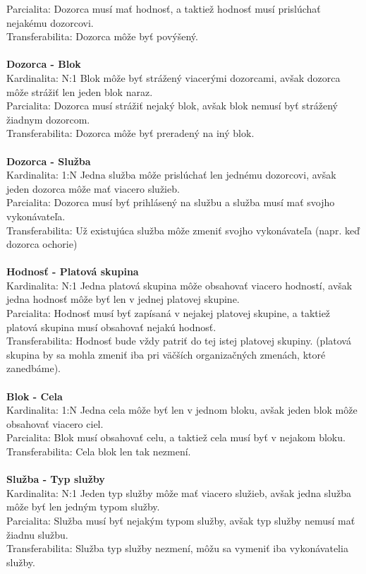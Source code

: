 \documentclass[slovak, 12pt, Times New Roman]{article}
\begin{document}
				Parcialita: Dozorca musí mať hodnosť, a taktiež hodnosť musí prislúchať nejakému dozorcovi.\\ 
				Transferabilita: Dozorca môže byť povýšený.\\ \\
			\textbf{Dozorca - Blok} \\
				Kardinalita: N:1 Blok môže byť strážený viacerými dozorcami, avšak dozorca môže strážiť len jeden blok naraz.\\
				Parcialita: Dozorca musí strážiť nejaký blok, avšak blok nemusí byť strážený žiadnym dozorcom.\\ 
				Transferabilita: Dozorca môže byť preradený na iný blok.\\ \\ \clearpage
			\textbf{Dozorca - Služba} \\
				Kardinalita: 1:N Jedna služba môže prislúchať len jednému dozorcovi, avšak jeden dozorca môže mať viacero služieb.\\
				Parcialita: Dozorca musí byť prihlásený na službu a služba musí mať svojho vykonávateľa.\\ 
				Transferabilita: Už existujúca služba môže zmeniť svojho vykonávateľa (napr. keď dozorca ochorie)\\ \\ 
			\textbf{Hodnosť - Platová skupina} \\
				Kardinalita: N:1 Jedna platová skupina môže obsahovať viacero hodností, avšak jedna hodnosť môže byť len v jednej platovej 
				skupine.\\
				Parcialita: Hodnosť musí byť zapísaná v nejakej platovej skupine, a taktiež platová skupina musí obsahovať nejakú hodnosť.\\ 
				Transferabilita: Hodnosť bude vždy patriť do tej istej platovej skupiny. (platová skupina by sa mohla zmeniť iba pri väčších organizačných zmenách, ktoré zanedbáme).\\ \\
			\textbf{Blok - Cela} \\
				Kardinalita: 1:N Jedna cela môže byť len v jednom bloku, avšak jeden blok môže obsahovať viacero ciel.\\
				Parcialita: Blok musí obsahovať celu, a taktiež cela musí byť v nejakom bloku.\\ 
				Transferabilita: Cela blok len tak nezmení.\\ \\
			\textbf{Služba - Typ služby} \\
				Kardinalita: N:1 Jeden typ služby môže mať viacero služieb, avšak jedna služba môže byť len jedným typom služby.\\
				Parcialita: Služba musí byť nejakým typom služby, avšak typ služby nemusí mať žiadnu službu.\\ 
				Transferabilita: Služba typ služby nezmení, môžu sa vymeniť iba vykonávatelia služby.\\ \\
		\clearpage
\end{document}
